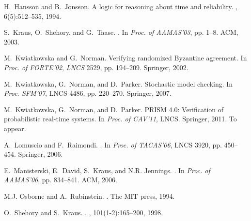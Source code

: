 \documentclass{llncs}
\begin{document}
{\begin{thebibliography}{10}
H.~Hansson and B.~Jonsson.
\newblock A logic for reasoning about time and reliability.
, 6(5):512--535, 1994.

S.~Kraus, O.~Shehory, and G.~Taase.
.
\newblock In {\em Proc. of AAMAS'03}, pp. 1--8. ACM, 2003.

M.~Kwiatkowska and G.~Norman.
\newblock Verifying randomized {Byzantine} agreement.
\newblock In {\em Proc. of FORTE'02}, {\em LNCS} 2529,
  pp. 194--209. Springer, 2002.

M.~Kwiatkowska, G.~Norman, and D.~Parker.
\newblock Stochastic model checking.
\newblock In {\em Proc. SFM'07}, LNCS 4486, pp. 220--270. Springer, 2007.

M.~Kwiatkowska, G.~Norman, and D.~Parker.
\newblock PRISM 4.0: Verification of probabilistic real-time systems.
\newblock In {\em Proc. of CAV'11}, LNCS. Springer, 2011.
\newblock To appear.

A.~Lomuscio and F.~Raimondi.
.
\newblock In {\em Proc. of TACAS'06}, LNCS 3920, pp. 450--454. Springer, 2006.

E.~Manisterski, E.~David, S.~Kraus, and N.R. Jennings.
.
\newblock In {\em Proc. of AAMAS'06}, pp. 834--841. ACM, 2006.

M.J. Osborne and A.~Rubinstein.
.
\newblock The MIT press, 1994.

O.~Shehory and S.~Kraus.
.
, 101(1-2):165--200, 1998.

\end{thebibliography}


}
%
%
%



\clearpage
\appendix
\end{document}

